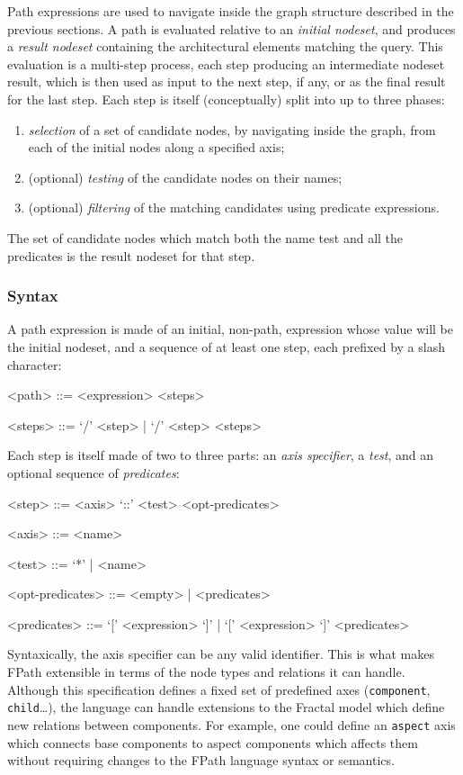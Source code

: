 \documentclass[a4paper,12pt]{report}
\newcommand{\axis}[1]{\texttt{#1}}
\begin{document}
Path expressions are used to navigate inside the graph structure described in the previous
sections. A path is evaluated relative to an \emph{initial nodeset}, and produces a
\emph{result nodeset} containing the architectural elements matching the query. This
evaluation is a multi-step process, each step producing an intermediate nodeset result,
which is then used as input to the next step, if any, or as the final result for the last
step. Each step is itself (conceptually) split into up to three phases:
\begin{enumerate}
\item \emph{selection} of a set of candidate nodes, by navigating inside the graph, from
  each of the initial nodes along a specified axis;
\item (optional) \emph{testing} of the candidate nodes on their names;
\item (optional) \emph{filtering} of the matching candidates using predicate expressions.
\end{enumerate}
The set of candidate nodes which match both the name test and all the predicates is the
result nodeset for that step.

\subsubsection{Syntax}
\label{sec:path-syntax}

A path expression is made of an initial, non-path, expression whose value will be the
initial nodeset, and a sequence of at least one step, each prefixed by a slash character:
\begin{grammar}
<path> ::= <expression> <steps>

<steps> ::= `/' <step> | `/' <step> <steps>
\end{grammar}

Each step is itself made of two to three parts: an \emph{axis specifier}, a \emph{test},
and an optional sequence of \emph{predicates}:
\begin{grammar}
<step> ::= <axis> `::' <test> <opt-predicates>

<axis> ::= <name>

<test> ::= `*' | <name>

<opt-predicates> ::= <empty> | <predicates>

<predicates> ::= `[' <expression> `]' | `[' <expression> `]' <predicates>
\end{grammar}

Syntaxically, the axis specifier can be any valid identifier. This is what makes FPath
extensible in terms of the node types and relations it can handle. Although this
specification defines a fixed set of predefined axes (\axis{component},
\axis{child}\dots), the language can handle extensions to the Fractal model which define
new relations between components. For example, one could define an \axis{aspect} axis
which connects base components to aspect components \cite{pessemier.misc2006} which
affects them without requiring changes to the FPath language syntax or semantics.
\end{document}
